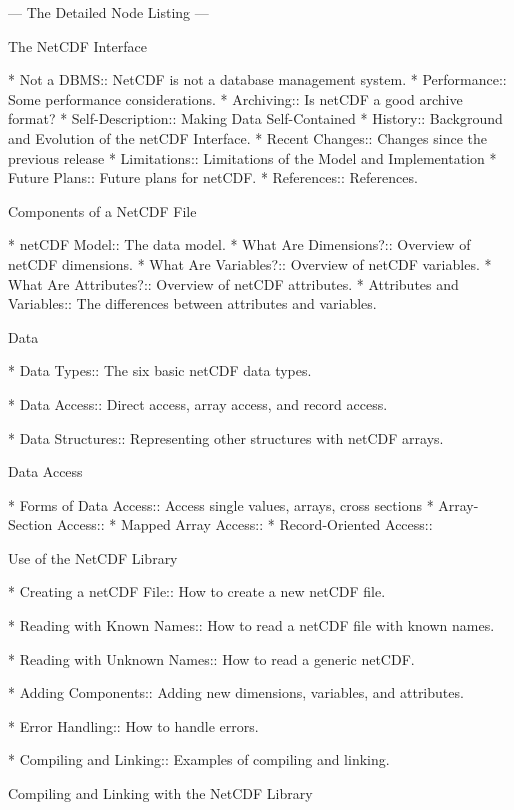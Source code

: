  --- The Detailed Node Listing ---

The NetCDF Interface

* Not a DBMS::                  NetCDF is not a database management system.
* Performance::                 Some performance considerations.
* Archiving::                   Is netCDF a good archive format?
* Self-Description::            Making Data Self-Contained
* History::                     Background and Evolution of the netCDF Interface.
* Recent Changes::              Changes since the previous release
* Limitations::                 Limitations of the Model and Implementation
* Future Plans::                Future plans for netCDF.
* References::                  References.

Components of a NetCDF File

* netCDF Model::                The data model.
* What Are Dimensions?::        Overview of netCDF dimensions.
* What Are Variables?::         Overview of netCDF variables.
* What Are Attributes?::        Overview of netCDF attributes.
* Attributes and Variables::    The differences between attributes and variables.

Data

* Data Types::                  The six basic netCDF data types.

* Data Access::                 Direct access, array access, and record access.

* Data Structures::             Representing other structures with netCDF arrays.

Data Access

* Forms of Data Access::        Access single values, arrays, cross sections
* Array-Section Access::
* Mapped Array Access::
* Record-Oriented Access::

Use of the NetCDF Library

* Creating a netCDF File::      How to create a new netCDF file.

* Reading with Known Names::    How to read a netCDF file with known names.

* Reading with Unknown Names::  How to read a generic netCDF.

* Adding Components::           Adding new dimensions, variables, and attributes.

* Error Handling::              How to handle errors.

* Compiling and Linking::       Examples of compiling and linking.

Compiling and Linking with the NetCDF Library

